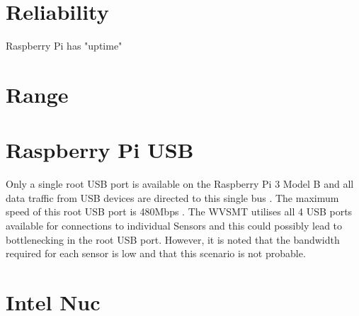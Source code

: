 \section{Reliability}
Raspberry Pi has "uptime"

\section{Range}


\section{Raspberry Pi USB}

Only a single root USB port is available on the Raspberry Pi 3 Model B and all data traffic from USB devices are directed to this single bus \cite{rpi3hardware}. The maximum speed of this root USB port is 480Mbps \cite{rpi3faqs}. The WVSMT utilises all 4 USB ports available for connections to individual Sensors and this could possibly lead to bottlenecking in the root USB port. However, it is noted that the bandwidth required for each sensor is low and that this scenario is not probable. 

\section{Intel Nuc}